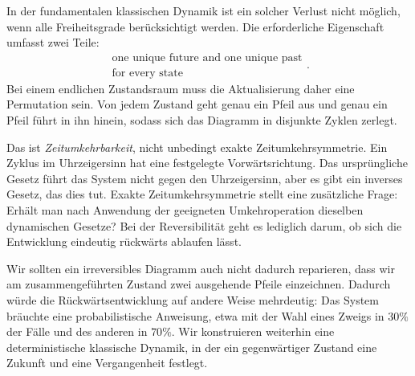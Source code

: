 In der fundamentalen klassischen Dynamik ist ein solcher Verlust nicht möglich, wenn alle Freiheitsgrade berücksichtigt werden. Die erforderliche Eigenschaft umfasst zwei Teile:
\begin{equation}
  \boxed{\begin{gathered}
    \text{one unique future and one unique past}\\
    \text{for every state}
  \end{gathered}.}
  \label{eq:l01-reversibility}
\end{equation}
Bei einem endlichen Zustandsraum muss die Aktualisierung daher eine Permutation sein. Von jedem Zustand geht genau ein Pfeil aus und genau ein Pfeil führt in ihn hinein, sodass sich das Diagramm in disjunkte Zyklen zerlegt.

\begin{classroomqa}
\end{classroomqa}

Das ist \emph{Zeitumkehrbarkeit}, nicht unbedingt exakte Zeitumkehrsymmetrie. Ein Zyklus im Uhrzeigersinn hat eine festgelegte Vorwärtsrichtung. Das ursprüngliche Gesetz führt das System nicht gegen den Uhrzeigersinn, aber es gibt ein inverses Gesetz, das dies tut. Exakte Zeitumkehrsymmetrie stellt eine zusätzliche Frage: Erhält man nach Anwendung der geeigneten Umkehroperation dieselben dynamischen Gesetze? Bei der Reversibilität geht es lediglich darum, ob sich die Entwicklung eindeutig rückwärts ablaufen lässt.

\begin{classroomqa}
\end{classroomqa}

Wir sollten ein irreversibles Diagramm auch nicht dadurch reparieren, dass wir am zusammengeführten Zustand zwei ausgehende Pfeile einzeichnen. Dadurch würde die Rückwärtsentwicklung auf andere Weise mehrdeutig: Das System bräuchte eine probabilistische Anweisung, etwa mit der Wahl eines Zweigs in \(30\%\) der Fälle und des anderen in \(70\%\). Wir konstruieren weiterhin eine deterministische klassische Dynamik, in der ein gegenwärtiger Zustand eine Zukunft und eine Vergangenheit festlegt.

